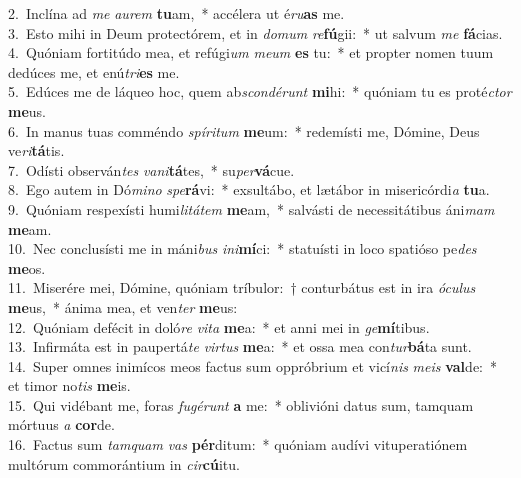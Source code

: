 {2.~}Inclína ad \textit{me} \textit{au}\textit{rem} \textbf{tu}am,~* accélera ut é\textit{ru}\textbf{as} me.\\
{3.~}Esto mihi in Deum protectórem, et in \textit{do}\textit{mum} \textit{re}\textbf{fú}gii:~* ut salvum \textit{me} \textbf{fá}cias.\\
{4.~}Quóniam fortitúdo mea, et refúgi\textit{um} \textit{me}\textit{um} \textbf{es} tu:~* et propter nomen tuum dedúces me, et enú\textit{tri}\textbf{es} me.\\
{5.~}Edúces me de láqueo hoc, quem ab\textit{scon}\textit{dé}\textit{runt} \textbf{mi}hi:~* quóniam tu es proté\textit{ctor} \textbf{me}us.\\
{6.~}In manus tuas comméndo \textit{spí}\textit{ri}\textit{tum} \textbf{me}um:~* redemísti me, Dómine, Deus ve\textit{ri}\textbf{tá}tis.\\
{7.~}Odísti observán\textit{tes} \textit{va}\textit{ni}\textbf{tá}tes,~* su\textit{per}\textbf{vá}cue.\\
{8.~}Ego autem in Dó\textit{mi}\textit{no} \textit{spe}\textbf{rá}vi:~* exsultábo, et lætábor in misericórdi\textit{a} \textbf{tu}a.\\
{9.~}Quóniam respexísti humi\textit{li}\textit{tá}\textit{tem} \textbf{me}am,~* salvásti de necessitátibus áni\textit{mam} \textbf{me}am.\\
{10.~}Nec conclusísti me in máni\textit{bus} \textit{i}\textit{ni}\textbf{mí}ci:~* statuísti in loco spatióso pe\textit{des} \textbf{me}os.\\
{11.~}Miserére mei, Dómine, quóniam tríbulor:~† conturbátus est in ira \textit{ó}\textit{cu}\textit{lus} \textbf{me}us,~* ánima mea, et ven\textit{ter} \textbf{me}us:\\
{12.~}Quóniam defécit in doló\textit{re} \textit{vi}\textit{ta} \textbf{me}a:~* et anni mei in \textit{ge}\textbf{mí}tibus.\\
{13.~}Infirmáta est in paupertá\textit{te} \textit{vir}\textit{tus} \textbf{me}a:~* et ossa mea con\textit{tur}\textbf{bá}ta sunt.\\
{14.~}Super omnes inimícos meos factus sum oppróbrium et vicí\textit{nis} \textit{me}\textit{is} \textbf{val}de:~* et timor no\textit{tis} \textbf{me}is.\\
{15.~}Qui vidébant me, foras \textit{fu}\textit{gé}\textit{runt} \textbf{a} me:~* oblivióni datus sum, tamquam mórtuus \textit{a} \textbf{cor}de.\\
{16.~}Factus sum \textit{tam}\textit{quam} \textit{vas} \textbf{pér}ditum:~* quóniam audívi vituperatiónem multórum commorántium in \textit{cir}\textbf{cú}itu.\\
